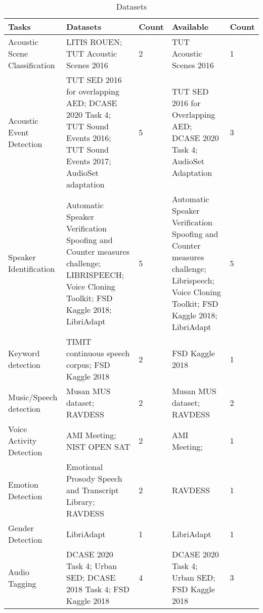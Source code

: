 \documentclass[12pt]{report}
\begin{document}
	\begin{table}[ht]
		\caption{Datasets} %
		\centering %
		\begin{tabular}{p{}p{}p{}p{}p{}} %
			\hline\hline %
			Tasks & Datasets & Count & Available & Count  \\ [0.5ex] %
			\hline %
			Acoustic Scene Classification & LITIS ROUEN; TUT Acoustic Scenes 2016 & 2 & TUT Acoustic Scenes 2016 & 1 \\
			Acoustic Event Detection & TUT SED 2016 for overlapping AED; DCASE 2020 Task 4; TUT Sound Events 2016; TUT Sound Events 2017; AudioSet adaptation & 5 & TUT SED 2016 for Overlapping AED; DCASE 2020 Task 4; AudioSet Adaptation & 3 \\
			Speaker Identification & Automatic Speaker Verification Spoofing and Counter measures challenge; LIBRISPEECH; Voice Cloning Toolkit; FSD Kaggle 2018; LibriAdapt & 5 & Automatic Speaker Verification Spoofing and Counter measures challenge; Librispeech; Voice Cloning Toolkit; FSD Kaggle 2018; LibriAdapt & 5 \\
			Keyword detection & TIMIT continuous speech corpus; FSD Kaggle 2018 & 2 & FSD Kaggle 2018 & 1 \\
			Music/Speech detection & Musan MUS dataset; RAVDESS & 2 & Musan MUS dataset; RAVDESS & 2 \\
			Voice Activity Detection & AMI Meeting; NIST OPEN SAT & 2 & AMI Meeting; & 1 \\
			Emotion Detection & Emotional Prosody Speech and Transcript Library; RAVDESS & 2 & RAVDESS & 1 \\
			Gender Detection & LibriAdapt & 1 & LibriAdapt & 1 \\
			Audio Tagging & DCASE 2020 Task 4; Urban SED; DCASE 2018 Task 4; FSD Kaggle 2018 & 4 & DCASE 2020 Task 4; Urban SED; FSD Kaggle 2018 & 3 \\ [1ex] %
			\hline %
		\end{tabular}
		\label{table:datasets} %
	\end{table}
%	
%	
	
	 
	
\end{document}
